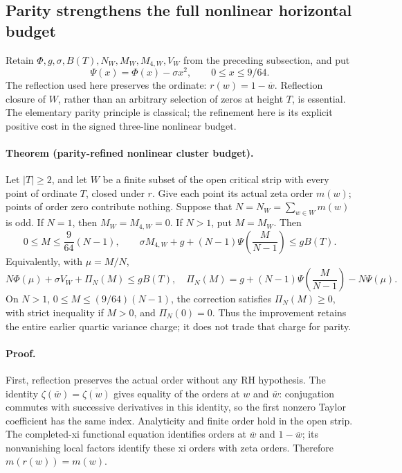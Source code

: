 \subsection{Parity strengthens the full nonlinear horizontal budget}
\label{sec:parity-horizontal-geometry}

Retain \(\Phi,g,\sigma,B(T),N_W,M_W,M_{4,W},V_W\) from the
preceding subsection, and put
\[
 \Psi(x)=\Phi(x)-\sigma x^2,\qquad 0\le x\le 9/64.
\]
The reflection used here preserves the ordinate:
\(r(w)=1-\overline w\).  Reflection closure of \(W\), rather than an
arbitrary selection of zeros at height \(T\), is essential.
The elementary parity principle is classical; the refinement here is its
explicit positive cost in the signed three-line nonlinear budget.

\paragraph{Theorem (parity-refined nonlinear cluster budget).}
\label{thm:parity-horizontal-budget}
Let \(|T|\ge2\), and let \(W\) be a finite subset of the open critical
strip with every point of ordinate \(T\), closed under \(r\).
Give each point its actual zeta order \(m(w)\); points of order zero
contribute nothing.  Suppose that \(N=N_W=\sum_{w\in W}m(w)\) is odd.
If \(N=1\), then \(M_W=M_{4,W}=0\).  If \(N>1\), put \(M=M_W\).
Then
\begin{equation}\label{eq:odd-horizontal-budget}
 0\le M\le\frac9{64}(N-1),\qquad
 \sigma M_{4,W}+g+(N-1)\Psi\!\left(\frac M{N-1}\right)
 \le gB(T).
\end{equation}
Equivalently, with \(\mu=M/N\),
\begin{equation}\label{eq:full-horizontal-parity-cost}
 N\Phi(\mu)+\sigma V_W+\Pi_N(M)\le gB(T),
\quad
 \Pi_N(M)=g+(N-1)\Psi\!\left(\frac M{N-1}\right)-N\Psi(\mu).
\end{equation}
On \(N>1\), \(0\le M\le(9/64)(N-1)\), the correction satisfies
\(\Pi_N(M)\ge0\), with strict inequality if \(M>0\), and
\(\Pi_N(0)=0\).  Thus the improvement retains the entire earlier
quartic variance charge; it does not trade that charge for parity.
\paragraph{Proof.}
First, reflection preserves the actual order without any RH hypothesis.
The identity \(\zeta(\overline w)=\overline{\zeta(w)}\) gives equality
of the orders at \(w\) and \(\overline w\): conjugation commutes with
successive derivatives in this identity, so the first nonzero Taylor
coefficient has the same index.  Analyticity and finite order hold in the
open strip.  The completed-xi functional equation identifies orders at
\(\overline w\) and \(1-\overline w\); its nonvanishing local factors
identify these xi orders with zeta orders.  Therefore
\(m(r(w))=m(w)\).

